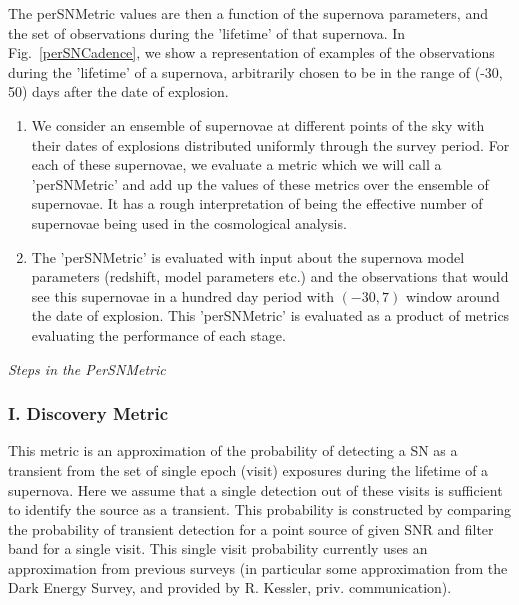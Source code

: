 The perSNMetric values are then a function of the supernova parameters, and the set of
observations during the 'lifetime' of that supernova. In Fig.~\ref{perSNCadence}, we show
a representation of examples of the observations during the 'lifetime' of a supernova,
arbitrarily chosen to be in the range of (-30, 50) days after the date of explosion.


\begin{enumerate}
\item We consider an ensemble of supernovae at different points of the sky with  their
dates of explosions distributed uniformly through the survey period. For each of these
supernovae, we evaluate a metric which we will call a 'perSNMetric' and add up the values
of these metrics over the ensemble of supernovae. It has a rough interpretation of being
the effective number of supernovae being used in the cosmological analysis. \item The
'perSNMetric' is evaluated with input about the supernova model parameters (redshift,
model parameters etc.) and the observations that would see this supernovae in a hundred
day period with $(-30, 7)$ window around the date of explosion. This 'perSNMetric' is
evaluated as a product of metrics evaluating the performance of each stage. 
\end{enumerate}
{\it  Steps in the PerSNMetric}
\subsubsection{I. Discovery Metric}
This metric is an approximation of the probability of detecting a SN as a transient from
the set of single epoch (visit) exposures during the lifetime of a supernova. Here we
assume that a single detection out of these visits is sufficient to identify the source as
a transient. This probability is constructed by comparing the probability of transient
detection for a point source of given SNR and filter band for a single visit. This single
visit probability currently uses an approximation from previous surveys (in particular
some approximation from the Dark Energy Survey, and provided by R. Kessler, priv.
communication).


